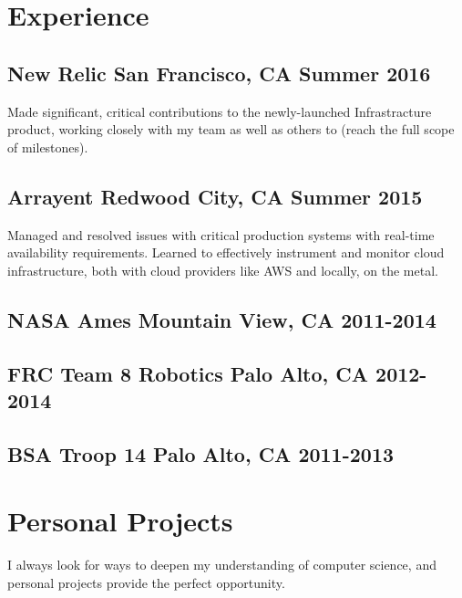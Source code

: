 \documentclass[letterpaper]{article}
\newcommand{\subtitle}{\normalfont\sffamily\color{black}\footnotesize}
\begin{document}
\sffamily
\section*{Experience}
\subsection*{New Relic \subtitle San Francisco, CA Summer 2016}


Made significant, critical contributions to the newly-launched Infrastracture
product, working closely with my team as well as others to (reach the full scope
of milestones).


\subsection*{Arrayent \subtitle Redwood City, CA Summer 2015}

Managed and resolved issues with critical production systems with real-time
availability requirements. Learned to effectively instrument and monitor cloud
infrastructure, both with cloud providers like AWS and locally, on the metal.

\subsection*{NASA Ames \subtitle Mountain View, CA 2011-2014}

\subsection*{FRC Team 8 Robotics \subtitle Palo Alto, CA 2012-2014}

\subsection*{BSA Troop 14 \subtitle Palo Alto, CA 2011-2013}

\section*{Personal Projects}

I always look for ways to deepen my understanding of computer science, and
personal projects provide the perfect opportunity.
\end{document}
